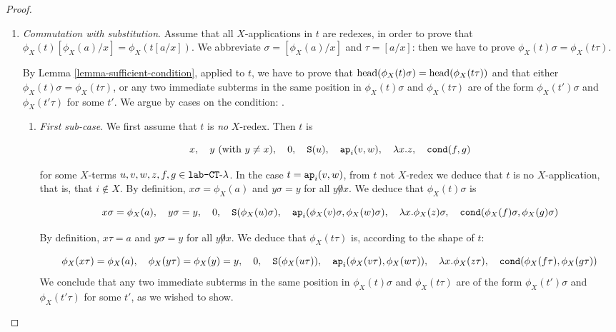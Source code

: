 \begin{proof}
\begin{enumerate}
\item
\emph{Commutation with substitution}.
Assume that all $X$-applications in $t$ are redexes, 
in order to prove that $\phi_{X}(t)[\phi_{X}(a)/x]= \phi_{X}(t[a/x])$.
We abbreviate $\sigma=[\phi_{X}(a)/x]$ and $\tau = [a/x]$: 
then we have to prove $\phi_{X}(t)\sigma= \phi_{X}(t\tau)$.

By Lemma \ref{lemma-sufficient-condition}, applied to $t$, we have to prove that
${\rm head}( \phi_{X}(t)\sigma ) = {\rm head}( \phi_{X}(t\tau) )$ 
and that either $\phi_{X}(t)\sigma= \phi_{X}(t\tau)$, or any two immediate subterms
in the same position in $\phi_{X}(t)\sigma$ and $\phi_{X}(t\tau)$ 
are of the form $\phi_{X}(t')\sigma$ and $\phi_{X}(t'\tau)$ for some $t'$.
We argue by cases on the condition: \emph{}.

\begin{enumerate}

\item
\label{lemma-phi-composition-union-02a}
\emph{First sub-case}.
We first assume that $t$ is \emph{no} $X$-redex. Then $t$ is

$$ 
x, \ \ \ 
y \   (\mbox{with $y\not = x$}), \ \ \  
0, \ \ \  
\Succ(u),  \ \ \  
\ap_i(v,w), \ \ \  
\lambda x.z, \ \ \  
\cond(f,g)
$$

for some $X$-terms $u,v,w,z,f,g \in {\mbox{\tt lab-} { {\tt CT}\mbox{-}\lambda} }$.
In the case $t = {\tt ap}_i(v,w)$, from $t$ not $X$-redex we deduce that $t$ is no
$X$-application, that is, that $i \not \in X$. By definition, $x \sigma = \phi_{X}(a)$
and $y \sigma =y$ for all  $y\not 0 x$.
We deduce that $\phi_{X}(t)\sigma$ is

$$ 
x \sigma = \phi_{X}(a), \ \ \ 
y \sigma = y, \ \ \  
0, \ \ \  
\Succ(\phi_X(u)\sigma),  \ \ \  
\ap_i(\phi_X(v)\sigma, \phi_X(w)\sigma), \ \ \  
\lambda x.\phi_X(z)\sigma, \ \ \  
\cond(\phi_X(f)\sigma, \phi_X(g)\sigma)
$$

By definition, $x \tau = a$
and $y \sigma =y$ for all  $y\not 0 x$.
We deduce that  $\phi_{X}(t\tau)$ is, according to the shape of $t$:

$$ 
\phi_{X}(x \tau) = \phi_{X}(a),   \ \ \ 
\phi_{X}(y \tau) = \phi_{X}(y) = y,   \ \ \  
0,   \ \ \  
\Succ(\phi_{X}(u\tau)),    \ \ \  
\ap_i(   \phi_{X}(v\tau),    \phi_{X}(w\tau)   ), \ \ \  
\lambda x.\phi_{X}(z\tau),    \ \ \  
\cond(    \phi_{X}(f\tau),     \phi_{X}(g\tau)    )
$$
We conclude that any two immediate subterms
in the same position in $\phi_{X}(t)\sigma$ and $\phi_{X}(t\tau)$ 
are of the form $\phi_{X}(t')\sigma$ and $\phi_{X}(t'\tau)$ for some $t'$, as we wished to show.


\end{enumerate}
\end{enumerate}
\end{proof}
